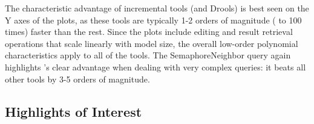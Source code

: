 % 

The characteristic advantage of incremental tools (\ie \eiq and Drools) is best seen on the Y axes of the plots, as these tools are typically 1-2 orders of magnitude ( to 100 times) faster than the rest. Since the plots include editing and result retrieval operations that scale linearly with model size, the overall low-order polynomial characteristics apply to all of the tools. The \textsf{SemaphoreNeighbor} query again highlights \eiq's clear advantage when dealing with very complex queries: it beats all other tools by 3-5 orders of magnitude.


% 

 
 

\subsection{Highlights of Interest}

